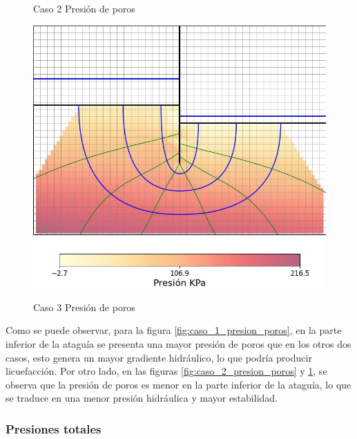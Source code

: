 \begin{figure}[H]
\begin{minipage}{0.32\textwidth}
        \caption{Caso 2 Presión de poros}
        \label{fig:caso_2_presion_poros}
    \end{minipage}
    \begin{minipage}{0.32\textwidth}
        \centering
        \includegraphics[width=\textwidth]{GRAFICOS/caso_3_presion_poros.jpg}
        \caption{Caso 3 Presión de poros}
        \label{fig:caso_3_presion_poros}
    \end{minipage}
\end{figure}

Como se puede observar, para la figura \ref{fig:caso_1_presion_poros}, en la parte inferior de la ataguía se presenta una mayor presión de poros que en los otros dos casos, esto genera un mayor gradiente hidráulico, lo que podría producir licuefacción. Por otro lado, en las figuras \ref{fig:caso_2_presion_poros} y \ref{fig:caso_3_presion_poros}, se observa que la presión de poros es menor en la parte inferior de la ataguía, lo que se traduce en una menor presión hidráulica y mayor estabilidad.

\subsubsection{Presiones totales}

